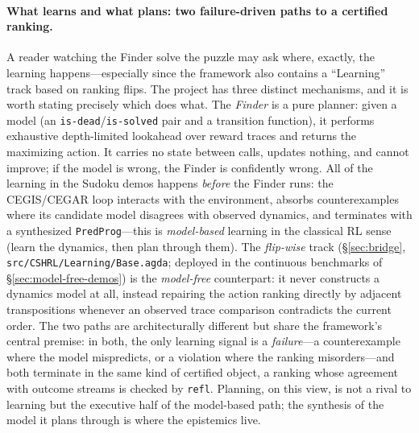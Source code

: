 \documentclass[9pt,a4paper]{article}
\newcommand{\fpath}[1]{\nolinkurl{#1}}
\theoremstyle{plain}
\theoremstyle{definition}
\theoremstyle{remark}
\begin{document}
\paragraph{What learns and what plans: two failure-driven paths to a certified ranking.}
A reader watching the Finder solve the puzzle may ask where, exactly, the learning happens---especially since the framework also contains a ``Learning'' track based on ranking flips.  The project has three distinct mechanisms, and it is worth stating precisely which does what.  The \emph{Finder} is a pure planner: given a model (an \texttt{is-dead}/\texttt{is-solved} pair and a transition function), it performs exhaustive depth-limited lookahead over reward traces and returns the maximizing action.  It carries no state between calls, updates nothing, and cannot improve; if the model is wrong, the Finder is confidently wrong.  All of the learning in the Sudoku demos happens \emph{before} the Finder runs: the CEGIS/CEGAR loop interacts with the environment, absorbs counterexamples where its candidate model disagrees with observed dynamics, and terminates with a synthesized \texttt{PredProg}---this is \emph{model-based} learning in the classical RL sense (learn the dynamics, then plan through them).  The \emph{flip-wise} track (\S\ref{sec:bridge}, \fpath{src/CSHRL/Learning/Base.agda}; deployed in the continuous benchmarks of \S\ref{sec:model-free-demos}) is the \emph{model-free} counterpart: it never constructs a dynamics model at all, instead repairing the action ranking directly by adjacent transpositions whenever an observed trace comparison contradicts the current order.  The two paths are architecturally different but share the framework's central premise: in both, the only learning signal is a \emph{failure}---a counterexample where the model mispredicts, or a violation where the ranking misorders---and both terminate in the same kind of certified object, a ranking whose agreement with outcome streams is checked by \texttt{refl}.  Planning, on this view, is not a rival to learning but the executive half of the model-based path; the synthesis of the model it plans through is where the epistemics live.
\end{document}
